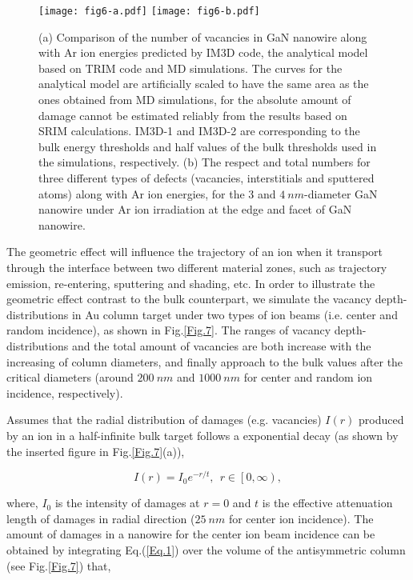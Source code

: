 \begin{figure}[!ht]\centering
\texttt{[image: fig6-a.pdf]}
\texttt{[image: fig6-b.pdf]}
\caption{(a) Comparison of the number of vacancies in GaN nanowire along with Ar ion energies predicted by IM3D code, the analytical model based on TRIM code and MD simulations. The curves for the analytical model are artificially scaled to have the same area as the ones obtained from MD simulations, for the absolute amount of damage cannot be estimated reliably from the results based on SRIM calculations\cite{Ren:2012}. IM3D-1 and IM3D-2 are corresponding to the bulk energy thresholds and half values of the bulk thresholds used in the simulations, respectively. (b) The respect and total numbers for three different types of defects (vacancies, interstitials and sputtered atoms) along with Ar ion energies, for the 3 and $4~nm$-diameter GaN nanowire under Ar ion irradiation at the edge and facet of GaN nanowire.} \label{Fig.6}
\end{figure}

The geometric effect will influence the trajectory of an ion when it transport through the interface between two different material zones, such as trajectory emission, re-entering, sputtering and shading, etc. In order to illustrate the geometric effect contrast to the bulk counterpart, we simulate the vacancy depth-distributions in Au column target under two types of ion beams (i.e. center and random incidence), as shown in Fig.\ref{Fig.7}. The ranges of vacancy depth-distributions and the total amount of vacancies are both increase with the increasing of column diameters, and finally approach to the bulk values after the critical diameters (around $200~nm$ and $1000~nm$ for center and random ion incidence, respectively).

Assumes that the radial distribution of damages (e.g. vacancies) $I \left( r \right)$ produced by an ion in a half-infinite bulk target follows a exponential decay (as shown by the inserted figure in Fig.\ref{Fig.7}(a)),

\noindent
\begin{equation}
I\left(r\right) = I_0 e^{-r/t},~~r \in \left[0, \infty\right), \label{Eq.1}
\end{equation}

\noindent where, $I_0$ is the intensity of damages at $r=0$ and $t$ is the effective attenuation length of damages in radial direction ($25~nm$ for center ion incidence). The amount of damages in a nanowire for the center ion beam incidence can be obtained by integrating Eq.(\ref{Eq.1}) over the volume of the antisymmetric column (see Fig.\ref{Fig.7}) that,

